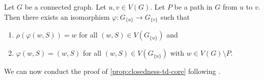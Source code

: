 \documentclass[a4paper,UKenglish,cleveref, autoref, thm-restate]{lipics-v2021}
\renewcommand{\phi}{\varphi}
\begin{document}
\begin{lemma}
	\label{lem:neuen4.3}
	Let $G$ be a connected graph. 
	Let $u, v\in V(G)$. Let $P$ be a path in $G$ from $u$ to $v$.
	Then there exists an isomorphism $\phi \colon G_{\{ u \}} \to G_{\{v\}}$ such that 
	\begin{enumerate}
		\item $\rho(\phi(w, S)) = w$ for all $(w, S) \in V(G_{\{u\}})$ and
		\item $\phi(w, S) = (w, S)$ for all $(w, S) \in V(G_{\{u\}})$ with $w \in V(G) \setminus P$.
	\end{enumerate}
\end{lemma}

We can now conduct the proof of \cref{prop:closedness-td-core} following \cite[Lemma~4.4]{neuen_homomorphism-distinguishing_2023}.
\end{document}
